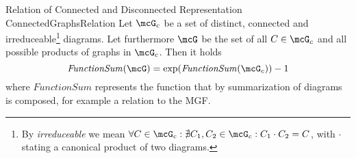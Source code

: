 \begin{mlem}{Relation of Connected and Disconnected Representation \cite{Hansen_McDonald_1979}}{ConnectedGraphsRelation}
    Let $\mcG_c$ be a set of distinct, connected and irreduceable\footnote{By \emph{irreduceable} we mean $\forall C\in\mcG_c:\nexists C_1,C_2\in\mcG_c:C_1\cdot C_2 = C$, with $\cdot$ stating a canonical product of two diagrams.} diagrams. Let furthermore $\mcG$ be the set of all $C\in\mcG_c$ and all possible products of graphs in $\mcG_c$. Then it holds
    \[
        \mathit{FunctionSum}(\mcG) = \exp(\mathit{FunctionSum}(\mcG_c)) - 1
    \]
    where $\mathit{FunctionSum}$ represents the function that by summarization of diagrams is composed, for example a relation to the MGF.
\end{mlem}